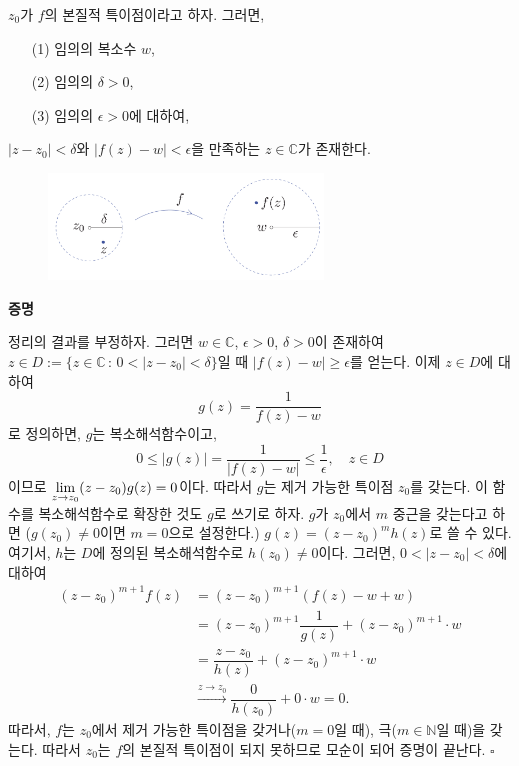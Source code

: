 \begin{salttheorem}  {}{}
\label{thm-4-10}
$z_0$가 $f$의 본질적 특이점이라고 하자. 그러면,
\begin{itemize}
\item[(1)] 임의의 복소수 $w$,
\item[(2)] 임의의 $\delta>0$,
\item[(3)] 임의의 $\epsilon>0$에 대하여,
\end{itemize}
$|z-z_0| <\delta$와 $|f(z) - w| < \epsilon$을 만족하는 
$z\in\mathbb C$가 
존재한다.
\end{salttheorem}

\begin{figure}[h!]
\begin{center}
\includegraphics[width=0.65\textwidth]{./SaltChapter/figs/fig-4-0-9}
\end{center}
\end{figure}

{\bf 증명}

정리의 결과를 부정하자.
그러면 $w\in\mathbb C$, $\epsilon>0$, $\delta>0$이 존재하여
$z\in D:= \{ z\in\mathbb C\,:\, 0<|z-z_0|<\delta\}$일 때
$|f(z) -w| \ge \epsilon$를 얻는다.
이제  $z\in D$에 대하여
\[
g(z) = \dfrac1{f(z)-w}
\]
로 정의하면, $g$는 복소해석함수이고,
\[
0\le |g(z)| = \dfrac1{|f(z)-w|} \le \dfrac1\epsilon, \quad
z\in D
\]
이므로 
$\lim\limits_{z\to z_0} (z-z_0)g(z) = 0$이다.
따라서 $g$는 제거 가능한 특이점 $z_0$를 갖는다.
이 함수를 복소해석함수로 확장한 것도 $g$로 쓰기로 하자.
$g$가 $z_0$에서 $m$ 중근을 갖는다고 하면
($g(z_0)\ne0$이면 $m=0$으로 설정한다.)
$g(z) = (z-z_0)^m h(z)$로 쓸 수 있다.
여기서, $h$는 $D$에 정의된 복소해석함수로 $h(z_0)\ne0$이다.
그러면, $0 < |z-z_0| < \delta$에 대하여
\begin{align*}
(z-z_0)^{m+1} f(z)
&= (z-z_0)^{m+1}(f(z) -w + w) \\
&= (z-z_0)^{m+1} \dfrac1{g(z)} + (z-z_0)^{m+1}\cdot w \\
&= \dfrac{z-z_0}{h(z)} + (z-z_0)^{m+1}\cdot w \\
& \xrightarrow{z\to z_0}
\dfrac0{h(z_0)} + 0 \cdot w = 0.
\end{align*}
따라서, $f$는 $z_0$에서 제거 가능한 특이점을 갖거나($m=0$일 때),
극($m\in\mathbb N$일 때)을 갖는다.
따라서 $z_0$는 $f$의 본질적 특이점이 되지 못하므로
모순이 되어 증명이 끝난다. \hfill $\square$

